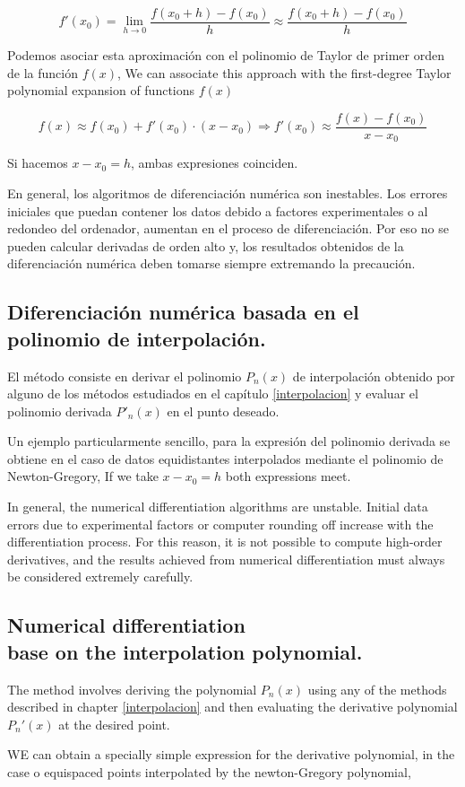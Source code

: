 \begin{equation*}
f'(x_0)=\lim_{h\rightarrow 0}\frac{f(x_0+h)-f(x_0)}{h} \approx \frac{f(x_0+h)-f(x_0)}{h} 
\end{equation*}
\begin{paracol}{2}
Podemos asociar esta aproximación con el polinomio de Taylor de primer orden de la función $f(x)$,
\switchcolumn
We can associate this approach with the first-degree Taylor polynomial expansion of functions $f(x)$
\end{paracol}
\begin{equation*}
f(x)\approx f(x_0)+f'(x_0)\cdot(x-x_0) \Rightarrow f'(x_0)\approx \frac{f(x)-f(x_0)}{x-x_0}
\end{equation*}
\begin{paracol}{2}
Si hacemos $x-x_0=h$, ambas expresiones coinciden.
 
En general, los algoritmos de diferenciación numérica son inestables. Los errores iniciales que puedan contener los datos debido a factores experimentales o al redondeo del ordenador, aumentan en el proceso de diferenciación. Por eso no se pueden calcular derivadas de orden alto y, los resultados obtenidos de la diferenciación numérica deben tomarse siempre extremando la precaución.

\subsection{Diferenciación numérica basada en el polinomio de interpolación.}

El método consiste en derivar el polinomio $P_n(x)$ de interpolación obtenido por alguno de los métodos estudiados en el capítulo \ref{interpolacion} y evaluar el polinomio derivada $P'_n(x)$ en el punto deseado.

Un ejemplo particularmente sencillo, para la expresión del polinomio derivada se obtiene  en el caso de datos equidistantes interpolados mediante el polinomio de Newton-Gregory,
\switchcolumn	
If we take $x-x_0 = h$ both expressions meet.

In general, the numerical differentiation algorithms are unstable. Initial data errors due to experimental factors or computer rounding off increase with the differentiation process. For this reason, it is not possible to compute high-order derivatives, and the results achieved from numerical differentiation must always be considered extremely carefully.

\subsection{Numerical differentiation\\ base on the interpolation polynomial.}

The method involves deriving the polynomial $P_n(x)$ using any of the methods described in chapter \ref{interpolacion} and then evaluating the derivative polynomial $P_n'(x)$ at the desired point.

WE can obtain a specially simple expression for the derivative polynomial, in the case o equispaced points interpolated by the newton-Gregory polynomial, 
\end{paracol}
